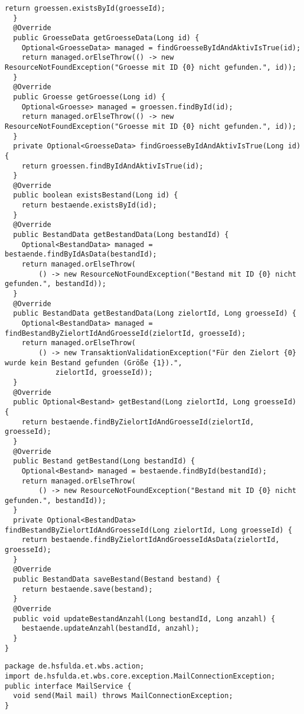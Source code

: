 \begin{lstlisting}[caption={Implementierung der Schnittstelle \code{TransaktionsDao} auf Seite von \code{repository}.}, label={lst:n_TransaktionDaoImpl}]
    return groessen.existsById(groesseId);
  }
  @Override
  public GroesseData getGroesseData(Long id) {
    Optional<GroesseData> managed = findGroesseByIdAndAktivIsTrue(id);
    return managed.orElseThrow(() -> new ResourceNotFoundException("Groesse mit ID {0} nicht gefunden.", id));
  }
  @Override
  public Groesse getGroesse(Long id) {
    Optional<Groesse> managed = groessen.findById(id);
    return managed.orElseThrow(() -> new ResourceNotFoundException("Groesse mit ID {0} nicht gefunden.", id));
  }
  private Optional<GroesseData> findGroesseByIdAndAktivIsTrue(Long id) {
    return groessen.findByIdAndAktivIsTrue(id);
  }
  @Override
  public boolean existsBestand(Long id) {
    return bestaende.existsById(id);
  }
  @Override
  public BestandData getBestandData(Long bestandId) {
    Optional<BestandData> managed = bestaende.findByIdAsData(bestandId);
    return managed.orElseThrow(
        () -> new ResourceNotFoundException("Bestand mit ID {0} nicht gefunden.", bestandId));
  }
  @Override
  public BestandData getBestandData(Long zielortId, Long groesseId) {
    Optional<BestandData> managed = findBestandByZielortIdAndGroesseId(zielortId, groesseId);
    return managed.orElseThrow(
        () -> new TransaktionValidationException("Für den Zielort {0} wurde kein Bestand gefunden (Größe {1}).",
            zielortId, groesseId));
  }
  @Override
  public Optional<Bestand> getBestand(Long zielortId, Long groesseId) {
    return bestaende.findByZielortIdAndGroesseId(zielortId, groesseId);
  }
  @Override
  public Bestand getBestand(Long bestandId) {
    Optional<Bestand> managed = bestaende.findById(bestandId);
    return managed.orElseThrow(
        () -> new ResourceNotFoundException("Bestand mit ID {0} nicht gefunden.", bestandId));
  }
  private Optional<BestandData> findBestandByZielortIdAndGroesseId(Long zielortId, Long groesseId) {
    return bestaende.findByZielortIdAndGroesseIdAsData(zielortId, groesseId);
  }
  @Override
  public BestandData saveBestand(Bestand bestand) {
    return bestaende.save(bestand);
  }
  @Override
  public void updateBestandAnzahl(Long bestandId, Long anzahl) {
    bestaende.updateAnzahl(bestandId, anzahl);
  }
}
\end{lstlisting}

\begin{lstlisting}[caption={Schnittstelle für die neue Komponente \code{mail}.}, label={lst:n_MailService}]
package de.hsfulda.et.wbs.action;
import de.hsfulda.et.wbs.core.exception.MailConnectionException;
public interface MailService { 
  void send(Mail mail) throws MailConnectionException;
}
\end{lstlisting}

